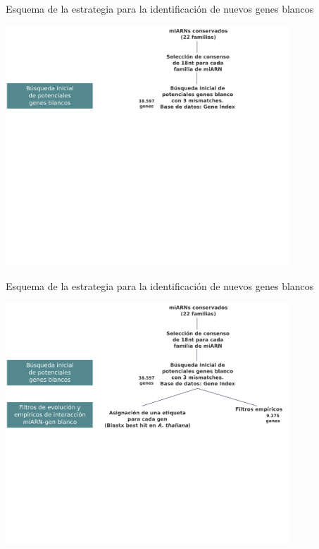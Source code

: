 \documentclass{beamer}
\begin{document}
\begin{frame}{Esquema de la estrategia para la identificación de nuevos genes blancos}
	\begin{center}
		\includegraphics[width=0.8\textwidth]{img/NAR_fig01_01.png}
	\end{center}
\end{frame}

\begin{frame}{Esquema de la estrategia para la identificación de nuevos genes blancos}
	\begin{center}
		\includegraphics[width=0.8\textwidth]{img/NAR_fig01_02.png}
	\end{center}
\end{frame}
\end{document}
